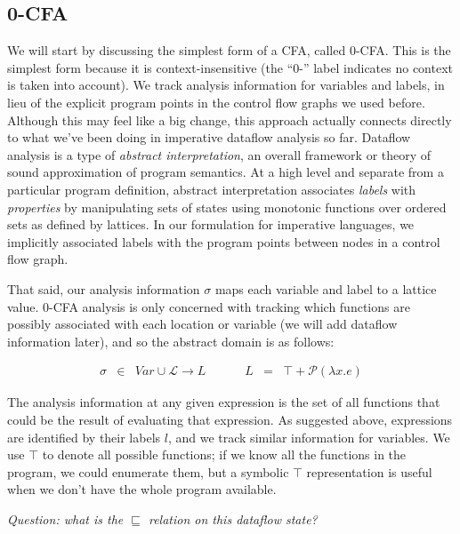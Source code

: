 \documentclass[11pt]{article}
\begin{document}
\subsection{0-CFA}

We will start by discussing the simplest form of a CFA, called 0-CFA. This is
the simplest form because it is context-insensitive (the ``0-'' label indicates
no context is taken into account).
%
We track analysis information for variables and labels, in lieu of the explicit
program points in the control flow graphs we used before. Although this may feel
like a big change, this approach actually connects directly to what we've been
doing in imperative dataflow analysis so far. Dataflow analysis is a type of
\emph{abstract interpretation}, an overall framework or theory of sound
approximation of program semantics. At a high level and separate from a
particular program definition, abstract interpretation associates \emph{labels}
with \emph{properties} by manipulating sets of states using monotonic functions
over ordered sets as defined by lattices. In our formulation for imperative
languages, we implicitly associated labels with the program points between nodes
in a control flow graph.

That said, our analysis information $\sigma$ maps each variable and label to a
lattice value. 0-CFA analysis is only concerned with tracking which functions
are possibly associated with each location or variable (we will add dataflow
information later), and so the abstract domain is as follows:


\[
\begin{array}{lllllll}
 \sigma & \in & \textit{Var} \cup \mathcal{L} \rightarrow L & ~~~~~~~ & L & = & \top + \mathcal{P}(\lambda x . e)
\end{array}
\]

The analysis information at any given expression is the set of all functions
that could be the result of evaluating that expression. As suggested above,
expressions are identified by their labels $l$, and we track similar information
for variables. We use $\top$ to denote all possible functions; if we know all
the functions in the program, we could enumerate them, but a symbolic $\top$
representation is useful when we don't have the whole program available.

\vspace{1ex}
\noindent\emph{Question: what is the $\sqsubseteq$ relation on this dataflow state?}
 \vspace{1ex}
\end{document}
